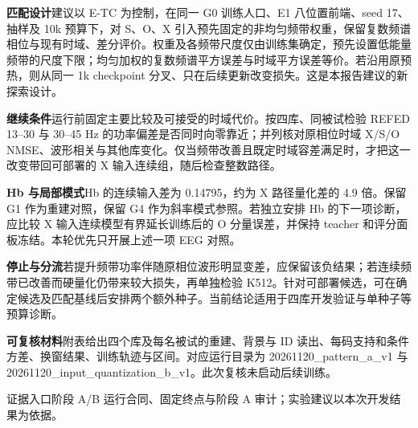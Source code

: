 \documentclass[11pt,a4paper,fontset=none]{ctexart}
\newcommand{\topic}[1]{{\bfseries\color{teal}#1}\quad}
\newcommand{\src}[1]{\vfill{\footnotesize\color{gray}证据入口\quad #1}\par}
\begin{document}
\topic{匹配设计}建议以 E-TC 为控制，在同一 G0 训练人口、E1 八位置前端、seed 17、抽样及 10k 预算下，对 S、O、X 引入预先固定的非均匀频带权重，保留复数频谱相位与现有时域、差分评价。权重及各频带尺度仅由训练集确定，预先设置低能量频带的尺度下限；均匀加权的复数频谱平方误差与时域平方误差等价。若沿用原预热，则从同一 1k checkpoint 分叉、只在后续更新改变损失。这是本报告建议的新探索设计。

\topic{继续条件}运行前固定主要比较及可接受的时域代价。按四库、同被试检验 REFED 13–30 与 30–45 Hz 的功率偏差是否同时向零靠近；并列核对原相位时域 X/S/O NMSE、波形相关与其他库变化。仅当频带改善且既定时域容差满足时，才把这一改变带回可部署的 X 输入连续组，随后检查整数路径。

\topic{Hb 与局部模式}Hb 的连续输入差为 0.14795，约为 X 路径量化差的 4.9 倍。保留 G1 作为重建对照，保留 G4 作为斜率模式参照。若独立安排 Hb 的下一项诊断，应比较 X 输入连续模型有界延长训练后的 O 分量误差，并保持 teacher 和评分面板冻结。本轮优先只开展上述一项 EEG 对照。

\topic{停止与分流}若提升频带功率伴随原相位波形明显变差，应保留该负结果；若连续频带已改善而硬量化仍带来较大损失，再单独检验 K512。针对可部署候选，可在确定候选及匹配基线后安排两个额外种子。当前结论适用于四库开发验证与单种子等预算诊断。

\topic{可复核材料}附表给出四个库及每名被试的重建、背景与 ID 读出、每码支持和条件方差、换窗结果、训练轨迹与区间。对应运行目录为 20261120\_pattern\_a\_v1 与 20261120\_input\_quantization\_b\_v1。此次复核未启动后续训练。

\src{阶段 A/B 运行合同、固定终点与阶段 A 审计；实验建议以本次开发结果为依据。}
\end{document}
